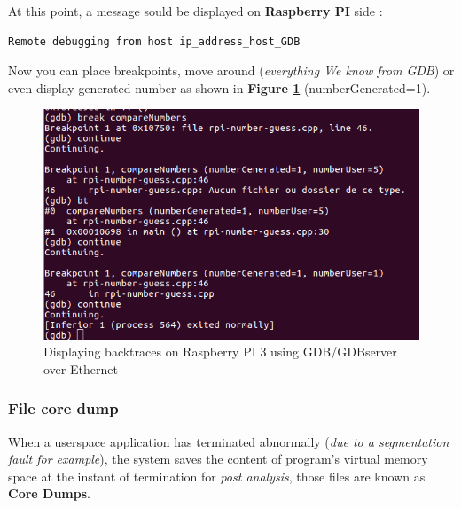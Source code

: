 \begin{enumerate}
	At this point, a message sould be displayed on \textbf{Raspberry PI} side :
	
		\begin{lstlisting}[style=BashInputStyle]
Remote debugging from host ip_address_host_GDB	
    \end{lstlisting}
    
    
Now you can place breakpoints, move around (\emph{everything We know from GDB}) or even display generated number as shown in \textbf{Figure \ref{Displaying backtraces on Raspberry PI 3 using GDB/GDBserver over Ethernet}}  (numberGenerated=1).   
\begin{figure}[H]
		\centering
        \includegraphics[scale=0.33]{img/solution/gdb-successfull-debug-over-ethernet.png}
        \caption{Displaying backtraces on Raspberry PI 3 using GDB/GDBserver over Ethernet}
        \label{Displaying backtraces on Raspberry PI 3 using GDB/GDBserver over Ethernet}
    \end{figure}    
    

\end{enumerate}

\subsubsection{File core dump}
When a userspace application has terminated abnormally (\emph{due to a segmentation fault for example}), the system saves the content of program's virtual memory space at the instant of termination for \textit{post analysis}, those files are known as \textbf{Core Dumps}.

